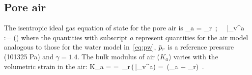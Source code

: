\subsection{Pore air}
The isentropic ideal gas equation of state for the pore air is
\Beq\label{eq:eos_air}
  \pbar_a = \pbar_r
  ~;~~ \bar{\Veps_v^a} := \ln\left(\right)
\Eeq
where the quantities with subscript $a$ represent quantities for the air model analogous to those
for the water model in~\eqref{eq:pw}, $\pbar_r$ is a reference pressure (101325 Pa) and $\gamma = 1.4$.
The bulk modulus of air ($K_a$) varies with the volumetric strain in the air:
\Beq
  K_a =  = \gamma\,\pbar_r\,\exp(\gamma\,\bar{\Veps_v^a})
      = \gamma\,(\pbar_a + \pbar_r) \,.
\Eeq


